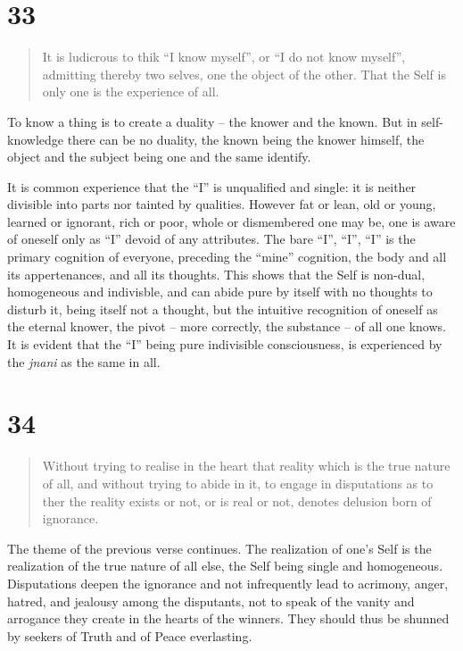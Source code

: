 \documentclass[12pt]{report}
\begin{document}
\section{33}

\begin{quote}
  It is ludicrous to thik ``I know myself'', or ``I do not know
  myself'', admitting thereby two selves, one the object of the
  other. That the Self is only one is the experience of all.
\end{quote}


To know a thing is to create a duality -- the knower and the
known. But in self-knowledge there can be no duality, the known being
the knower himself, the object and the subject being one and the same
identify.

It is common experience that the ``I'' is unqualified and single: it
is neither divisible into parts nor tainted by qualities. However fat
or lean, old or young, learned or ignorant, rich or poor, whole or
dismembered one may be, one is aware of oneself only as ``I'' devoid
of any attributes. The bare ``I'', ``I'', ``I'' is the primary
cognition of everyone, preceding the ``mine'' cognition, the body and
all its appertenances, and all its thoughts. This shows that the Self
is non-dual, homogeneous and indivisble, and can abide pure by itself
with no thoughts to disturb it, being itself not a thought, but the
intuitive recognition of oneself as the eternal knower, the pivot --
more correctly, the substance -- of all one knows. It is evident that
the ``I'' being pure indivisible consciousness, is experienced by the
\emph{jnani} as the same in all.

\section{34}

\begin{quote}
  Without trying to realise in the heart that reality which is the
  true nature of all, and without trying to abide in it, to engage in
  disputations as to ther the reality exists or not, or is real or
  not, denotes delusion born of ignorance.
\end{quote}


The theme of the previous verse continues. The realization of one's
Self is the realization of the true nature of all else, the Self being
single and homogeneous. Disputations deepen the ignorance and not
infrequently lead to acrimony, anger, hatred, and jealousy among the
disputants, not to speak of the vanity and arrogance they create in
the hearts of the winners. They should thus be shunned by seekers of
Truth and of Peace everlasting.
\end{document}
